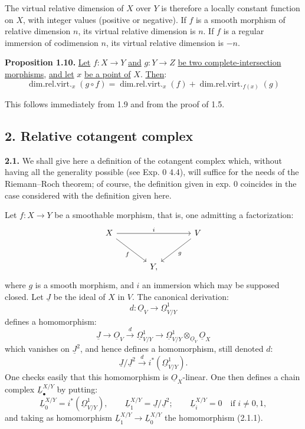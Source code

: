 The virtual relative dimension of $X$ over $Y$ is therefore a locally constant function on $X$, with integer values (positive or negative). If $f$ is a smooth morphism of relative dimension $n$, its virtual relative dimension is $n$. If $f$ is a regular immersion of codimension $n$, its virtual relative dimension is $-n$.

\textbf{Proposition 1.10.} \uline{Let} $f:X\to Y$ \uline{and} $g:Y\to Z$ \uline{be two complete-intersection morphisms}, \uline{and let} $x$ \uline{be a point of} $X$. \uline{Then}:
\[
\operatorname{dim.rel.virt.}_x(g\circ f)=
\operatorname{dim.rel.virt.}_x(f)+
\operatorname{dim.rel.virt.}_{f(x)}(g)
\]

%
This follows immediately from 1.9 and from the proof of 1.5.

\subsection*{2. Relative cotangent complex}

\textbf{2.1.} We shall give here a definition of the cotangent complex which, without having all the generality possible (see Exp. 0 4.4), will suffice for the needs of the Riemann--Roch theorem; of course, the definition given in exp. 0 coincides in the case considered with the definition given here.

Let $f:X\to Y$ be a smoothable morphism, that is, one admitting a factorization:
\[
\begin{tikzcd}[column sep=large,row sep=large]
X \arrow[rr,"i"] \arrow[dr,"f"'] && V \arrow[dl,"g"]\\
& Y, &
\end{tikzcd}
\]
where $g$ is a smooth morphism, and $i$ an immersion which may be supposed closed. Let $\underline{J}$ be the ideal of $X$ in $V$. The canonical derivation:
\[
d:\underline{O}_V\longrightarrow\underline{\Omega}^1_{V/Y}
\]
defines a homomorphism:
\[
\underline{J}\longrightarrow\underline{O}_V\xrightarrow{d}\underline{\Omega}^1_{V/Y}\longrightarrow
\underline{\Omega}^1_{V/Y}\otimes_{\underline{O}_V}\underline{O}_X
\]
which vanishes on $\underline{J}^2$, and hence defines a homomorphism, still denoted $d$:
\begin{equation}\tag{2.1.1}
\underline{J}/\underline{J}^2\xrightarrow{d} i^*(\underline{\Omega}^1_{V/Y}).
\end{equation}
One checks easily that this homomorphism is $\underline{O}_X$-linear. One then defines a chain complex $\underline{L}^{X/Y}_\bullet$ by putting:
\[
\underline{L}^{X/Y}_0=i^*(\underline{\Omega}^1_{V/Y}),\qquad
\underline{L}^{X/Y}_1=\underline{J}/\underline{J}^2;
\qquad
\underline{L}^{X/Y}_i=0\quad\text{if }i\neq0,1,
\]
and taking as homomorphism $\underline{L}^{X/Y}_1\to \underline{L}^{X/Y}_0$ the homomorphism (2.1.1).
